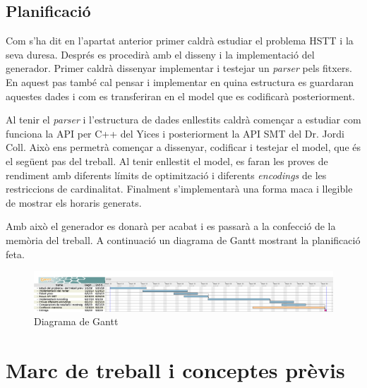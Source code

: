 \documentclass[11pt,a4paper,twoside]{report}
\begin{document}
  \section{Planificació}

  Com s'ha dit en l'apartat anterior primer caldrà estudiar el problema HSTT i la seva duresa. 
  Després es procedirà amb el disseny i la implementació del generador. Primer caldrà dissenyar implementar i testejar un \textit{parser} pels fitxers. En aquest pas també cal pensar i implementar en quina estructura es guardaran aquestes dades i com es transferiran en el model que es codificarà posteriorment. 

  Al tenir el \textit{parser} i l'estructura de dades enllestits caldrà començar a estudiar com funciona la API per C++ del Yices i 
  posteriorment la API SMT del Dr. Jordi Coll. Això ens permetrà començar a dissenyar, codificar i testejar el model, que és el següent pas del treball. 
  Al tenir enllestit el model, es faran les proves de rendiment amb diferents límits de optimització i diferents \textit{encodings} de les restriccions de cardinalitat.
  Finalment s'implementarà una forma maca i llegible de mostrar els horaris generats.
  
  Amb això el generador es donarà per acabat i es passarà a la confecció de la memòria del treball. 
  A continuació un diagrama de Gantt mostrant la planificació feta.



  \begin{figure}
    \centering
    \includegraphics[angle=90,origin=c,height=0.58\textheight]{Diagrames/gantt1.png} 
    \caption{Diagrama de Gantt}
    \label{fig:Gantt}
  \end{figure}




  \chapter{Marc de treball i conceptes prèvis}
\end{document}

